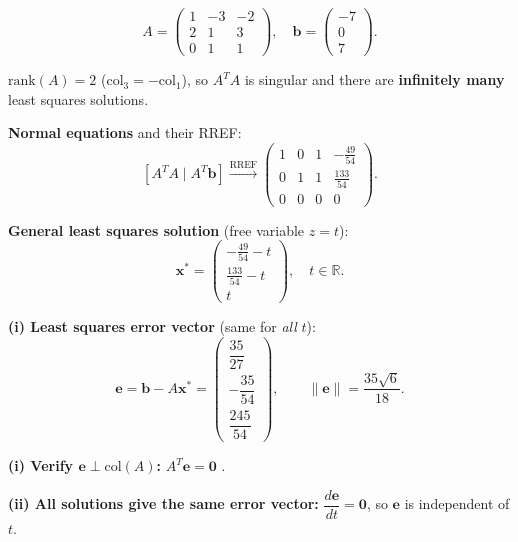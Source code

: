 \documentclass[12pt,a3paper]{article}
\begin{document}
\begin{tcolorbox}[enhanced,breakable,
  colback=cD!4,colframe=cD,boxrule=0.8pt,arc=5pt,
  title={\textbf{Answer --- Least Squares: $x-3y-2z=-7,\;2x+y+3z=0,\;y+z=7$}},
  fonttitle=\bfseries\color{white},colbacktitle=cD]

\[
A=\begin{pmatrix}1&-3&-2\\2&1&3\\0&1&1\end{pmatrix},\quad
\mathbf{b}=\begin{pmatrix}-7\\0\\7\end{pmatrix}.
\]

$\mathrm{rank}(A)=2$ (col$_3 = -$col$_1$), so $A^TA$ is singular and there are \textbf{infinitely many} least squares solutions.

\textbf{Normal equations} and their RREF:
\[
\left[A^TA\;\Big|\;A^T\mathbf{b}\right]
\xrightarrow{\text{RREF}}
\begin{pmatrix}1&0&1&-\frac{49}{54}\\[4pt]0&1&1&\frac{133}{54}\\[4pt]0&0&0&0\end{pmatrix}.
\]

\textbf{General least squares solution} (free variable $z=t$):
\[
\mathbf{x}^* = \begin{pmatrix}-\tfrac{49}{54}-t\\[4pt]\tfrac{133}{54}-t\\[4pt]t\end{pmatrix},\quad t\in\mathbb{R}.
\]

\textbf{(i) Least squares error vector} (same for \emph{all} $t$):
\[
\mathbf{e} = \mathbf{b}-A\mathbf{x}^* = \begin{pmatrix}\dfrac{35}{27}\\[6pt]-\dfrac{35}{54}\\[6pt]\dfrac{245}{54}\end{pmatrix},\qquad
\|\mathbf{e}\| = \frac{35\sqrt{6}}{18}.
\]

\textbf{(i) Verify $\mathbf{e}\perp\mathrm{col}(A)$:}
$A^T\mathbf{e}=\mathbf{0}$ . \checkmark

\textbf{(ii) All solutions give the same error vector:}
$\dfrac{d\mathbf{e}}{dt}=\mathbf{0}$, so $\mathbf{e}$ is independent of $t$. \checkmark

\end{tcolorbox}
\end{document}

